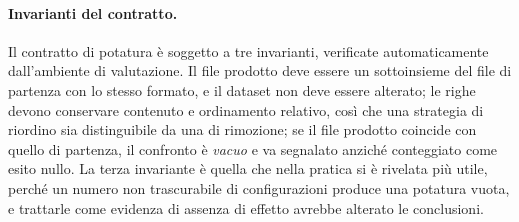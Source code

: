 \paragraph{Invarianti del contratto.} Il contratto di potatura è soggetto a tre invarianti,
verificate automaticamente dall'ambiente di valutazione. Il file prodotto deve essere un
sottoinsieme del file di partenza con lo stesso formato, e il dataset non deve essere alterato; le
righe devono conservare contenuto e ordinamento relativo, così che una strategia di riordino sia
distinguibile da una di rimozione; se il file prodotto coincide con quello di partenza, il
confronto è \emph{vacuo} e va segnalato anziché conteggiato come esito nullo. La terza invariante
è quella che nella pratica si è rivelata più utile, perché un numero non trascurabile di
configurazioni produce una potatura vuota, e trattarle come evidenza di assenza di effetto
avrebbe alterato le conclusioni.
